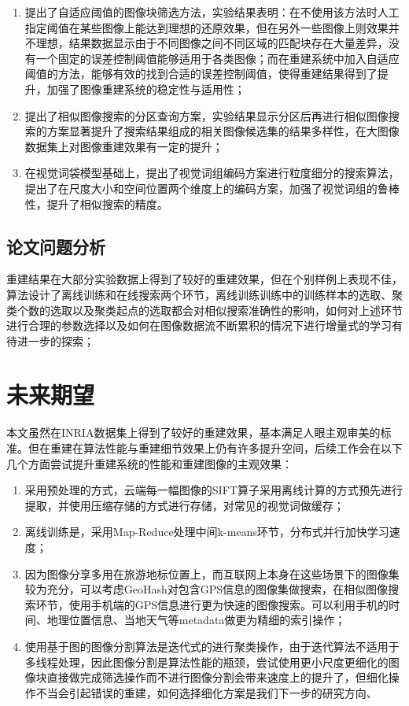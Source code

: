 \begin{enumerate}
\item 提出了自适应阈值的图像块筛选方法，实验结果表明：在不使用该方法时人工指定阈值在某些图像上能达到理想的还原效果，但在另外一些图像上则效果并不理想，结果数据显示由于不同图像之间不同区域的匹配块存在大量差异，没有一个固定的误差控制阈值能够适用于各类图像；而在重建系统中加入自适应阈值的方法，能够有效的找到合适的误差控制阈值，使得重建结果得到了提升，加强了图像重建系统的稳定性与适用性；
\item 提出了相似图像搜索的分区查询方案，实验结果显示分区后再进行相似图像搜索的方案显著提升了搜索结果组成的相关图像候选集的结果多样性，在大图像数据集上对图像重建效果有一定的提升；
\item 在视觉词袋模型基础上，提出了视觉词组编码方案进行粒度细分的搜索算法，提出了在尺度大小和空间位置两个维度上的编码方案，加强了视觉词组的鲁棒性，提升了相似搜索的精度。
\end{enumerate}

\subsection{论文问题分析}

重建结果在大部分实验数据上得到了较好的重建效果，但在个别样例上表现不佳，算法设计了离线训练和在线搜索两个环节，离线训练训练中的训练样本的选取、聚类个数的选取以及聚类起点的选取都会对相似搜索准确性的影响，如何对上述环节进行合理的参数选择以及如何在图像数据流不断累积的情况下进行增量式的学习有待进一步的探索；

\section{未来期望}

本文虽然在INRIA数据集上得到了较好的重建效果，基本满足人眼主观审美的标准。但在重建在算法性能与重建细节效果上仍有许多提升空间，后续工作会在以下几个方面尝试提升重建系统的性能和重建图像的主观效果：

\begin{enumerate}
\item 采用预处理的方式，云端每一幅图像的SIFT算子采用离线计算的方式预先进行提取，并使用压缩存储的方式进行存储，对常见的视觉词做缓存；
\item 离线训练是，采用Map-Reduce处理中间k-means环节，分布式并行加快学习速度；
\item 因为图像分享多用在旅游地标位置上，而互联网上本身在这些场景下的图像集较为充分，可以考虑GeoHash对包含GPS信息的图像集做搜索，在相似图像搜索环节，使用手机端的GPS信息进行更为快速的图像搜索。可以利用手机的时间、地理位置信息、当地天气等metadata做更为精细的索引操作；
\item 使用基于图的图像分割算法是迭代式的进行聚类操作，由于迭代算法不适用于多线程处理，因此图像分割是算法性能的瓶颈，尝试使用更小尺度更细化的图像块直接做完成筛选操作而不进行图像分割会带来速度上的提升了，但细化操作不当会引起错误的重建，如何选择细化方案是我们下一步的研究方向、
\end{enumerate}
